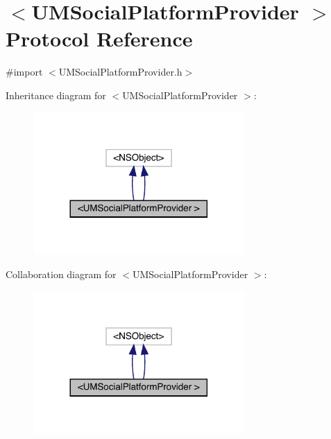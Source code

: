 \hypertarget{protocol_u_m_social_platform_provider_01-p}{}\section{$<$U\+M\+Social\+Platform\+Provider $>$ Protocol Reference}
\label{protocol_u_m_social_platform_provider_01-p}


{\ttfamily \#import $<$U\+M\+Social\+Platform\+Provider.\+h$>$}



Inheritance diagram for $<$U\+M\+Social\+Platform\+Provider $>$\+:\nopagebreak
\begin{figure}[H]
\begin{center}
\leavevmode
\includegraphics[width=228pt]{protocol_u_m_social_platform_provider_01-p__inherit__graph}
\end{center}
\end{figure}


Collaboration diagram for $<$U\+M\+Social\+Platform\+Provider $>$\+:\nopagebreak
\begin{figure}[H]
\begin{center}
\leavevmode
\includegraphics[width=228pt]{protocol_u_m_social_platform_provider_01-p__coll__graph}
\end{center}
\end{figure}
